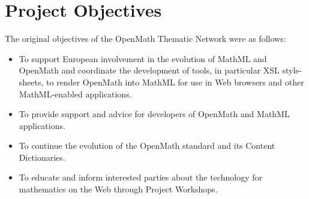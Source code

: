 \chapter{Project Objectives}

The original objectives of the OpenMath Thematic Network were as
follows:

\begin{itemize}

\item To support European involvement in the evolution of MathML and
OpenMath and coordinate the development of tools, in particular XSL
style-sheets, to render OpenMath into MathML for use in Web browsers and
other MathML-enabled applications.

\item To provide support and advice for developers of OpenMath and
MathML applications.

\item To continue the evolution of the OpenMath standard and its Content
Dictionaries.

\item To educate and inform interested parties about the technology for
mathematics on the Web through Project Workshops.

\end{itemize}

